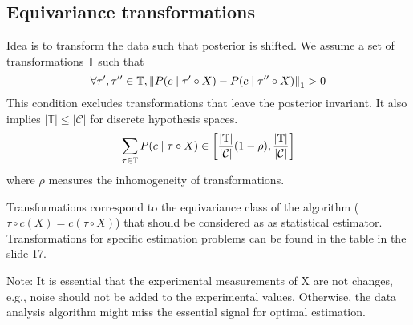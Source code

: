 \documentclass[12pt]{article}
\begin{document}
\subsection{Equivariance transformations}
Idea is to transform the data such that posterior is shifted. We assume a set of transformations $\mathbb{T}$ such that
\[ \forall \tau',\tau'' \in \mathbb{T}, \left\lVert P(c\mid \tau'\circ X) - P(c\mid \tau''\circ X)\right\rVert_1 > 0 \]
This condition excludes transformations that leave the posterior invariant. It also implies $|\mathbb{T}|\leq |\mathcal{C}|$ for discrete hypothesis spaces. 
\[ \sum_{\tau\in\mathbb{T}} P(c\mid \tau\circ X) \in 
\left[ \frac{|\mathbb{T}|}{|\mathcal{C}|}(1-\rho), \frac{|\mathbb{T}|}{|\mathcal{C}|} \right] \]
where $\rho$ measures the inhomogeneity of transformations.
\par Transformations correspond to the equivariance class of the algorithm ($\tau\circ c(X) = c(\tau\circ X)$) that should be considered as as statistical estimator. Transformations for specific estimation problems can be found in the table in the slide 17.
\par Note: It is essential that the experimental measurements of X are not changes, e.g., noise should not be added to the experimental values. Otherwise, the data analysis algorithm might miss the essential signal for optimal estimation.
\end{document}
